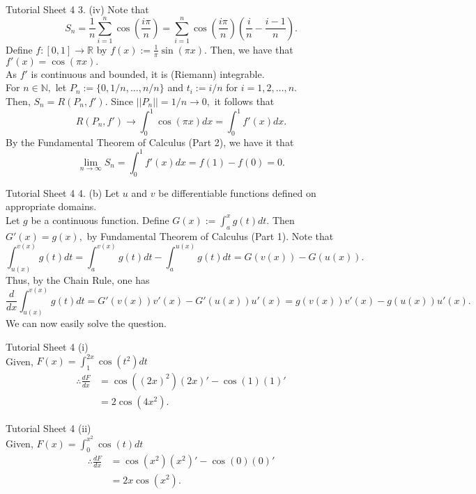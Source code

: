 \documentclass[aspectratio=169]{beamer}
\begin{document}
\begin{frame}{Tutorial Sheet 4}
	3. (iv) Note that \\
	\[S_n = \dfrac{1}{n}\sum_{i=1}^{n}\cos\left(\dfrac{i\pi}{n}\right) = \sum_{i=1}^{n}\cos\left(\dfrac{i\pi}{n}\right)\left(\frac{i}{n} - \frac{i-1}{n}\right) .\]
	Define $f:[0, 1] \to \mathbb{R}$ by $f(x) := \frac{1}{\pi}\sin(\pi x).$ Then, we have that $f'(x) = \cos(\pi x).$\\
	As $f'$ is continuous and bounded, it is (Riemann) integrable. \\
	For $n \in \mathbb{N},$ let $P_n := \{0, 1/n, \ldots, n/n\}$ and $t_i := i/n$ for $i = 1, 2, \ldots, n.$\\
	Then, $S_n = R(P_n, f').$ Since $||P_n|| = 1/n \to 0,$ it follows that
	\[R(P_n, f') \to \int_{0}^{1} \cos(\pi x) dx = \int_{0}^{1} f'(x) dx. \]
	By the Fundamental Theorem of Calculus (Part 2), we have it that
	\[\lim_{n\to \infty}S_n = \int_{0}^{1} f'(x) dx = f(1) - f(0) = 0.\]
\end{frame}

\begin{frame}{Tutorial Sheet 4}
	4. (b) Let $u$ and $v$ be differentiable functions defined on appropriate domains.\\
	Let $g$ be a continuous function. Define $G(x) := \displaystyle\int_{a}^{x} g(t) dt.$ Then $G'(x) = g(x),$ by Fundamental Theorem of Calculus (Part 1). Note that
	\[\int_{u(x)}^{v(x)} g(t) dt = \int_{a}^{v(x)} g(t) dt - \int_{a}^{u(x)} g(t) dt = G(v(x)) - G(u(x)).\]
	Thus, by the Chain Rule, one has
	\[\dfrac{d}{dx}\int_{u(x)}^{v(x)} g(t) dt = G'(v(x))v'(x) - G'(u(x))u'(x) = g(v(x))v'(x) - g(u(x))u'(x).\]
	We can now easily solve the question.
\end{frame}
	
\begin{frame}{Tutorial Sheet 4}
	(i)\\
	Given, $F(x) = \displaystyle\int_{1}^{2x} \cos(t^2) dt $
	\begin{align*}
		\therefore \frac{dF}{dx} &= \cos\left((2x)^2\right)(2x)' - \cos(1)(1)' \\
		&= 2\cos(4x^2).
	\end{align*}
\end{frame}

\begin{frame}{Tutorial Sheet 4}
	(ii)\\
	Given, $F(x) = \displaystyle\int_{0}^{x^2} \cos(t) dt $
	\begin{align*}
		\therefore \frac{dF}{dx} &= \cos\left(x^2\right)(x^2)' - \cos(0)(0)'\\
		& = 2x\cos(x^2).
	\end{align*}
\end{frame}
\end{document}
